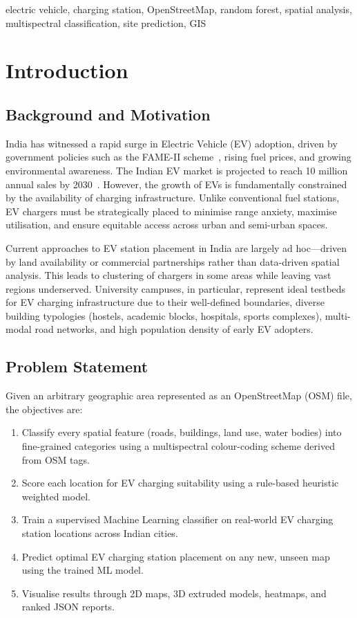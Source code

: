 \documentclass[conference]{IEEEtran}
\begin{document}
\begin{IEEEkeywords}
electric vehicle, charging station, OpenStreetMap, random forest, spatial analysis, multispectral classification, site prediction, GIS
\end{IEEEkeywords}

\section{Introduction}

\subsection{Background and Motivation}

India has witnessed a rapid surge in Electric Vehicle (EV) adoption, driven by government policies such as the FAME-II scheme~\cite{b6}, rising fuel prices, and growing environmental awareness. The Indian EV market is projected to reach 10 million annual sales by 2030~\cite{b1}. However, the growth of EVs is fundamentally constrained by the availability of charging infrastructure. Unlike conventional fuel stations, EV chargers must be strategically placed to minimise range anxiety, maximise utilisation, and ensure equitable access across urban and semi-urban spaces.

Current approaches to EV station placement in India are largely ad hoc---driven by land availability or commercial partnerships rather than data-driven spatial analysis. This leads to clustering of chargers in some areas while leaving vast regions underserved. University campuses, in particular, represent ideal testbeds for EV charging infrastructure due to their well-defined boundaries, diverse building typologies (hostels, academic blocks, hospitals, sports complexes), multi-modal road networks, and high population density of early EV adopters.

\subsection{Problem Statement}

Given an arbitrary geographic area represented as an OpenStreetMap (OSM) file, the objectives are:
\begin{enumerate}
\item Classify every spatial feature (roads, buildings, land use, water bodies) into fine-grained categories using a multispectral colour-coding scheme derived from OSM tags.
\item Score each location for EV charging suitability using a rule-based heuristic weighted model.
\item Train a supervised Machine Learning classifier on real-world EV charging station locations across Indian cities.
\item Predict optimal EV charging station placement on any new, unseen map using the trained ML model.
\item Visualise results through 2D maps, 3D extruded models, heatmaps, and ranked JSON reports.
\end{enumerate}
\end{document}
